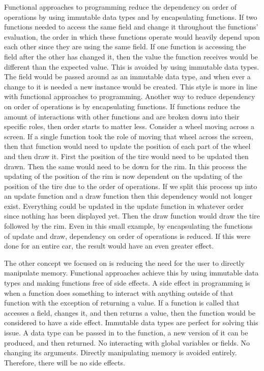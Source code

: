 \documentclass[12pt]{article}
\begin{document}
Functional approaches to programming reduce the dependency on order of operations by using immutable data types and by encapsulating functions. If two functions needed to access the same field and change it throughout the functions' evaluation, the order in which these functions operate would heavily depend upon each other since they are using the same field. If one function is accessing the field after the other has changed it, then the value the function receives would be different than the expected value. This is avoided by using immutable data types. The field would be passed around as an immutable data type, and when ever a change to it is needed a new instance would be created. This style is more in line with functional approaches to programming. Another way to reduce dependency on order of operations is by encapsulating functions. If functions reduce the amount of interactions with other functions and are broken down into their specific roles, then order starts to matter less. Consider a wheel moving across a screen. If a single function took the role of moving that wheel across the screen, then that function would need to update the position of each part of the wheel and then draw it. First the position of the tire would need to be updated then drawn. Then the same would need to be down for the rim. In this process the updating of the position of the rim is now dependent on the updating of the position of the tire due to the order of operations. If we split this process up into an update function and a draw function then this dependency would not longer exist. Everything could be updated in the update function in whatever order since nothing has been displayed yet. Then the draw function would draw the tire followed by the rim. Even in this small example, by encapsulating the functions of update and draw, dependency on order of operations is reduced. If this were done for an entire car, the result would have an even greater effect.

The other concept we focused on is reducing the need for the user to directly manipulate memory. Functional approaches achieve this by using immutable data types and making functions free of side effects. A side effect in programming is when a function does something to interact with anything outside of that function with the exception of returning a value. If a function is called that accesses a field, changes it, and then returns a value, then the function would be considered to have a side effect. Immutable data types are perfect for solving this issue. A data type can be passed in to the function, a new version of it can be produced, and then returned. No interacting with global variables or fields. No changing its arguments. Directly manipulating memory is avoided entirely. Therefore, there will be no side effects. 
\end{document}
